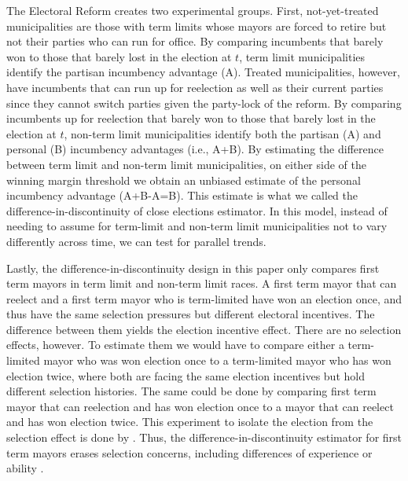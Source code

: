 \documentclass[12pt]{amsart}
\makeatletter
\def\subsection{\@startsection{subsection}{2}
	\z@{.8\linespacing\@plus.7\linespacing}{.7\linespacing}{\large}}
\numberwithin{equation}{section}
\theoremstyle{definition}
\theoremstyle{definition}
\theoremstyle{definition}
\makeatother
\begin{document}
The Electoral Reform creates two experimental groups. First, not-yet-treated municipalities are those with term limits whose mayors are forced to retire but not their parties who can run for office. By comparing incumbents that barely won to those that barely lost in the election at $t$, term limit municipalities identify the partisan incumbency advantage (A). Treated municipalities, however, have incumbents that can run up for reelection as well as their current parties since they cannot switch parties given the party-lock of the reform. By comparing incumbents up for reelection that barely won to those that barely lost in the election at $t$, non-term limit municipalities identify both the partisan (A) and personal (B) incumbency advantages (i.e., A+B). By estimating the difference between term limit and non-term limit municipalities, on either side of the winning margin threshold we obtain an unbiased estimate of the personal incumbency advantage (A+B-A=B). This estimate is what we called the difference-in-discontinuity of close elections estimator. In this model, instead of needing to assume for term-limit and non-term limit municipalities not to vary differently across time, we can test for parallel trends. 

Lastly, the difference-in-discontinuity design in this paper only compares first term mayors in term limit and non-term limit races. A first term mayor that can reelect and a first term mayor who is term-limited have won an election once, and thus have the same selection pressures but different electoral incentives. The difference between them yields the election incentive effect. There are no selection effects, however. To estimate them we would have to compare either a term-limited mayor who was won election once to a term-limited mayor who has won election twice, where both are facing the same election incentives but hold different selection histories. The same could be done by comparing first term mayor that can reelection and has won election once to a mayor that can reelect and has won election twice. This experiment to isolate the election from the selection effect is done by \citet{ashworth_2012}. Thus, the difference-in-discontinuity estimator for first term mayors erases selection concerns, including differences of experience or ability \citep{ferraz_finan_2008, ferraz_finan_2011}. 


\subsection{Mexico's 2014 Term Limit Reform}
\end{document}
